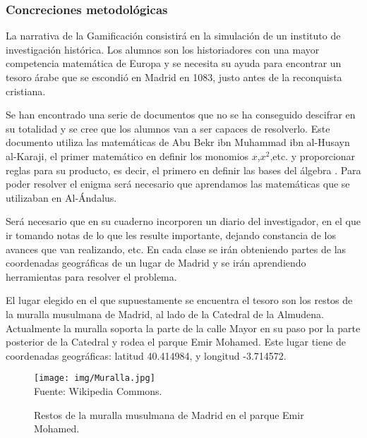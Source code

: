 \subsubsection{Concreciones metodológicas}

La narrativa de la Gamificación consistirá en la simulación de un instituto de investigación histórica.
%
Los alumnos son los historiadores con una mayor competencia matemática de Europa y se necesita su ayuda para encontrar un tesoro árabe que se escondió en Madrid en 1083, justo antes de la reconquista cristiana.

Se han encontrado una serie de documentos que no se ha conseguido descifrar en su totalidad y se cree que los alumnos van a ser capaces de resolverlo.
%
Este documento utiliza las matemáticas de Abu Bekr ibn Muhammad ibn al-Husayn al-Karaji, el primer matemático en definir los monomios $x$,$x^2$,etc. y proporcionar reglas para su producto, es decir, el primero en definir las bases del álgebra \citep{MatArabe}.
%
Para poder resolver el enigma será necesario que aprendamos las matemáticas que se utilizaban en Al-Ándalus.

Será necesario que en su cuaderno incorporen un diario del investigador, en el que ir tomando notas de lo que les resulte importante, dejando constancia de los avances que van realizando, etc.
%
En cada clase se irán obteniendo partes de las coordenadas geográficas de un lugar de Madrid y se irán aprendiendo herramientas para resolver el problema.

El lugar elegido en el que supuestamente se encuentra el tesoro son los restos de la muralla musulmana de Madrid, al lado de la Catedral de la Almudena. 
%
Actualmente la muralla soporta la parte de la calle Mayor en su paso por la parte posterior de la Catedral y rodea el parque Emir Mohamed.
%
Este lugar tiene de coordenadas geográficas: latitud 40.414984, y longitud -3.714572.
%
\label{defn:coordenadas}

\begin{figure}[hbtp]
\centering
\caption{Restos de la muralla musulmana de Madrid en el parque Emir Mohamed.}
\label{img:MurallaMusulmana}
\texttt{[image: img/Muralla.jpg]}
\\
\small{Fuente: Wikipedia Commons.}
\end{figure}
\FloatBarrier




